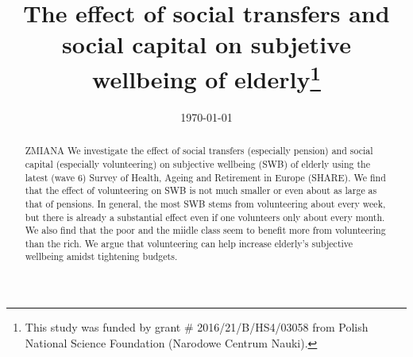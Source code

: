 \documentclass[10pt, letterpaper]{article}
\date{{}\today}
\title{  
The effect of social transfers and social capital on subjetive wellbeing of
elderly\footnote{This study was funded by grant \# 2016/21/B/HS4/03058 from
  Polish National Science Foundation (Narodowe Centrum Nauki).}
}
\author{
}
\begin{document}

%
\maketitle
\vspace{-.4in}
\begin{center}

\end{center}


\begin{abstract}
\noindent ZMIANA We investigate the effect of social transfers (especially pension) and
social capital (especially volunteering) on subjective wellbeing (SWB) of elderly using the latest (wave 6) Survey of Health, Ageing and Retirement in Europe
(SHARE). We find that the effect of volunteering on SWB is not much smaller or
even about as large as that of pensions. In general, the most SWB stems from volunteering about
every week, but there is already a substantial effect even if one volunteers only
about every month. We also find that the poor and the miidle
class seem to benefit more from volunteering than the rich.
We argue that volunteering can help increase elderly's subjective wellbeing amidst tightening budgets.
\end{abstract}
\vspace{.15in} 
\vspace{.25in} 
\end{document}
